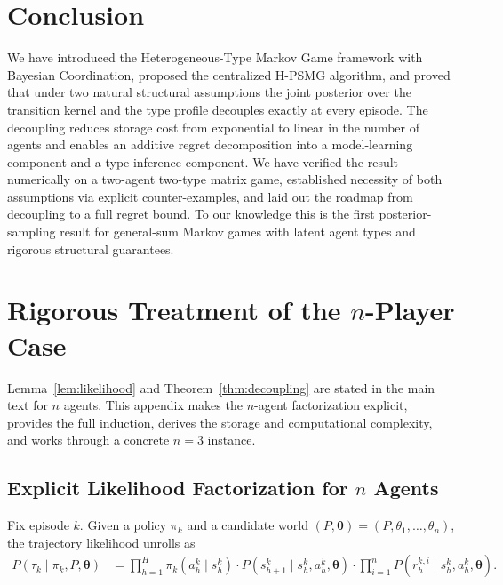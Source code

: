 \documentclass{article}
\begin{document}
\section{Conclusion}
\label{sec:conclusion}

We have introduced the Heterogeneous-Type Markov Game framework with Bayesian Coordination, proposed the centralized H-PSMG algorithm, and proved that under two natural structural assumptions the joint posterior over the transition kernel and the type profile decouples exactly at every episode. The decoupling reduces storage cost from exponential to linear in the number of agents and enables an additive regret decomposition into a model-learning component and a type-inference component. We have verified the result numerically on a two-agent two-type matrix game, established necessity of both assumptions via explicit counter-examples, and laid out the roadmap from decoupling to a full regret bound. To our knowledge this is the first posterior-sampling result for general-sum Markov games with latent agent types and rigorous structural guarantees.




\appendix

\section{Rigorous Treatment of the \texorpdfstring{$n$}{n}-Player Case}
\label{app:n-player}

Lemma~\ref{lem:likelihood} and Theorem~\ref{thm:decoupling} are stated in the main text for $n$ agents. This appendix makes the $n$-agent factorization explicit, provides the full induction, derives the storage and computational complexity, and works through a concrete $n=3$ instance.

\subsection{Explicit Likelihood Factorization for \texorpdfstring{$n$}{n} Agents}

Fix episode $k$. Given a policy $\pi_k$ and a candidate world $(P, \boldsymbol{\theta}) = (P, \theta_1, \ldots, \theta_n)$, the trajectory likelihood unrolls as
\begin{align}
P(\tau_k \mid \pi_k, P, \boldsymbol{\theta}) &= \prod_{h=1}^H \pi_k(a_h^k \mid s_h^k) \cdot P(s_{h+1}^k \mid s_h^k, a_h^k, \boldsymbol{\theta}) \cdot \prod_{i=1}^n P(r_h^{k,i} \mid s_h^k, a_h^k, \boldsymbol{\theta}). \label{eq:n-lik-raw}
\end{align}
\end{document}
